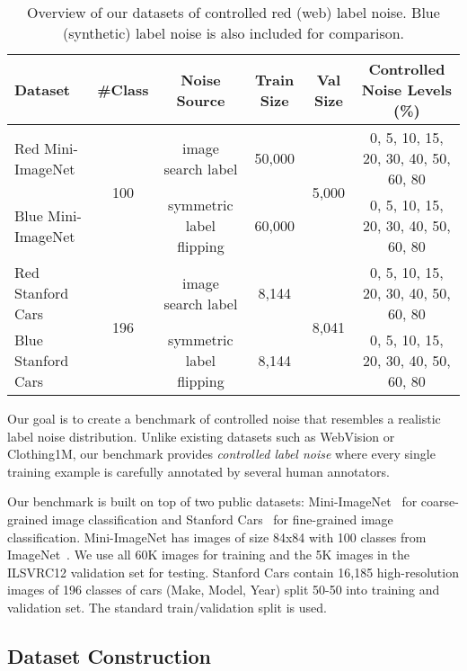 \documentclass{article}
\begin{document}
\begin{table*}[ht]
\centering
\caption{\label{tab:dataset}Overview of our datasets of controlled red (web) label noise. Blue (synthetic) label noise is also included for comparison.}
\begin{tabular}{lccccc}
\toprule
{\bf Dataset} & \multicolumn{1}{l}{{\bf \#Class}} & {\bf Noise Source} & {\bf Train Size} & {\bf Val Size} & {\bf Controlled Noise Levels (\%)} \\
\midrule
Red Mini-ImageNet & \multirow{2}{*}{100} & image search label & 50,000 & \multirow{2}{*}{5,000} & 0, 5, 10, 15, 20, 30, 40, 50, 60, 80 \\
Blue Mini-ImageNet &  & symmetric label flipping & 60,000 &  & 0, 5, 10, 15, 20, 30, 40, 50, 60, 80 \\ \hline
Red Stanford Cars & \multirow{2}{*}{196} & image search label & 8,144 & \multirow{2}{*}{8,041} & 0, 5, 10, 15, 20, 30, 40, 50, 60, 80 \\
Blue Stanford Cars &  & symmetric label flipping & 8,144 &  & 0, 5, 10, 15, 20, 30, 40, 50, 60, 80 \\
\bottomrule
\end{tabular}
\vspace{-5mm}
\end{table*}

Our goal is to create a benchmark of controlled noise that resembles a realistic label noise distribution. Unlike existing datasets such as WebVision or Clothing1M, our benchmark provides \emph{controlled label noise} where every single training example is carefully annotated by several human annotators.

Our benchmark is built on top of two public datasets: Mini-ImageNet~\citep{vinyals2016matching} for coarse-grained image classification and Stanford Cars~\citep{krause2013collecting} for fine-grained image classification.
Mini-ImageNet has images of size 84x84 with 100 classes from ImageNet~\citep{deng2009imagenet}. We use all 60K images for training and the 5K images in the ILSVRC12 validation set for testing. Stanford Cars contain 16,185 high-resolution images of 196 classes of cars (Make, Model, Year) split 50-50 into training and validation set. The standard train/validation split is used.


\subsection{Dataset Construction}
\end{document}
